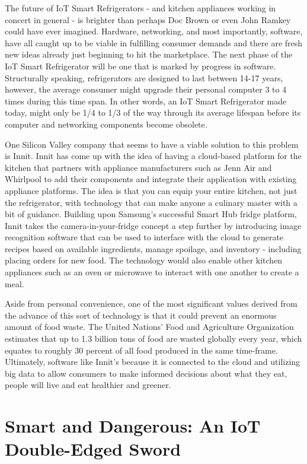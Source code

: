 \documentclass[sigconf]{acmart}
\begin{document}
The future of IoT Smart Refrigerators - and kitchen appliances working in concert in general - is brighter than perhaps Doc Brown or even John Ramkey could have ever imagined. Hardware, networking, and most importantly, software, have all caught up to be viable in fulfilling consumer demands and there are fresh new ideas already just beginning to hit the marketplace. The next phase of the IoT Smart Refrigerator will be one that is marked by progress in software. Structurally speaking, refrigerators are designed to last between 14-17 years\cite{SFGate2017}, however, the average consumer might upgrade their personal computer 3 to 4 times during this time span. In other words, an IoT Smart Refrigerator made today, might only be 1/4 to 1/3 of the way through its average lifespan before its computer and networking components become obsolete. 
\par
One Silicon Valley company that seems to have a viable solution to this problem is Innit\cite{Innit2017}. Innit has come up with the idea of having a cloud-based platform for the kitchen that partners with appliance manufacturers such as Jenn Air and Whirlpool to add their components and integrate their application with existing appliance platforms. The idea is that you can equip your entire kitchen, not just the refrigerator, with technology that can make anyone a culinary master with a bit of guidance\cite{CNBC2017}. Building upon Samsung's successful Smart Hub fridge platform, Innit takes the camera-in-your-fridge concept a step further by introducing image recognition software that can be used to interface with the cloud to generate recipes based on available ingredients, manage spoilage, and inventory - including placing orders for new food. The technology would also enable other kitchen appliances such as an oven or microwave to interact with one another to create a meal. 
\par
Aside from personal convenience, one of the most significant values derived from the advance of this sort of technology is that it could prevent an enormous amount of food waste. The United Nations' Food and Agriculture Organization estimates that up to 1.3 billion tons of food are wasted globally every year\cite{FAO2017}, which equates to roughly 30 percent of all food produced in the same time-frame.  Ultimately, software like Innit's because it is connected to the cloud and utilizing big data to allow consumers to make informed decisions about what they eat, people will live and eat healthier and greener.  

\section{Smart and Dangerous: An IoT Double-Edged Sword}
\end{document}
